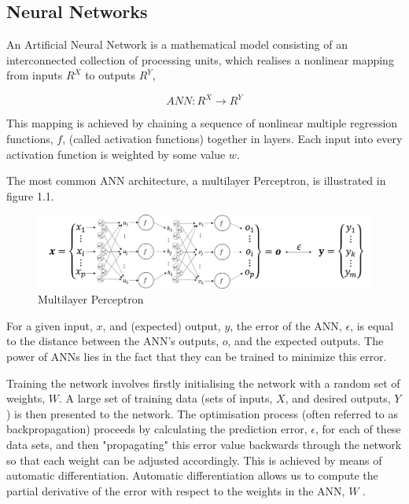 \documentclass[11pt,oneside,openany,a4paper,english, report, goldenblock
]{usthesis}
\begin{document}
\subsection{Neural Networks}
An Artificial Neural Network is a mathematical model consisting of an interconnected collection of processing units, which realises a nonlinear mapping from inputs $R^X$ to outputs $R^Y$,

\begin{equation}
	ANN: R^X \rightarrow R^Y
\end{equation}

This mapping is achieved by chaining a sequence of nonlinear multiple regression functions, $f$, (called activation functions) together in layers.  Each input into every activation function is weighted by some value $w$.


The most common ANN architecture, a multilayer Perceptron, is illustrated in figure 1.1.

\begin{figure}[h]
	\centering
	\includegraphics[width=1\linewidth]{Images/Diagrams/NeuralNetwork}
	\caption[Multilayer Perceptron]{Multilayer Perceptron}
	\label{fig:neuralnetwork}
\end{figure}

For a given input, $x$, and (expected) output, $y$, the error of the ANN, $ \epsilon $, is equal to the distance between the ANN's outputs, $o$, and the expected outputs. The power of ANNs lies in the fact that they can be trained to minimize this error. 


Training the network involves firstly initialising the network with a random set of weights, $W$. A large set of training data (sets of inputs, $X$, and desired outputs, $Y$) is then presented to the network. The optimisation process (often referred to as backpropagation) proceeds by calculating the prediction error, $ \epsilon $, for each of these data sets, and then "propagating" this error value backwards through the network so that each weight can be adjusted accordingly. This is achieved by means of automatic differentiation. Automatic differentiation allows us to compute the partial derivative of the error with respect to the weights in the ANN, $W$ \citep{Werbos}.
\end{document}
